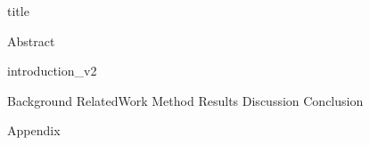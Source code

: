\documentclass{article}
\begin{document}
{title}

\frontmatter

\tableofcontents

\listoffigures
\listoftables

\mainmatter

{Abstract}

{introduction_v2}

{Background}
{RelatedWork}
{Method}
{Results}
{Discussion}
{Conclusion}

\newpage
\printbibliography[heading = bibintoc]    %

\newpage
\appendix
{Appendix}

\end{document}
